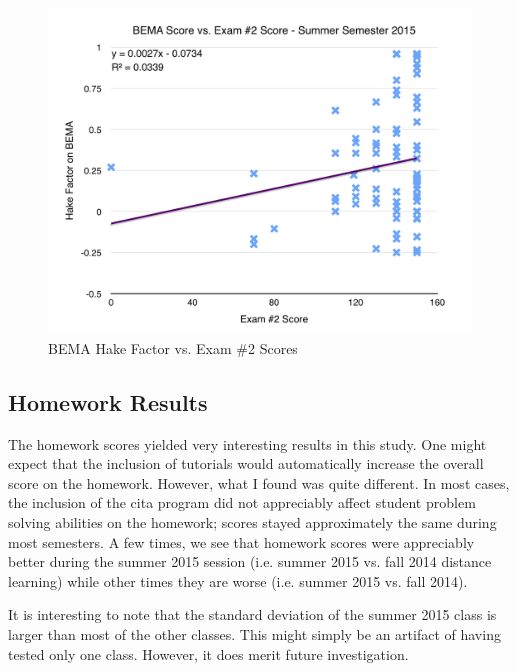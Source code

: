 \begin{figure}
	\centering
	\includegraphics[width=6in]{img/chapter4/bema_vs_ex2_su15}
	\caption[BEMA Hake Factor vs. Exam \#2 Scores]{BEMA Hake Factor vs. Exam \#2 Scores}
  \label{fig:bemaVsExTwoSu15}
\end{figure}

\subsection{Homework Results}

The homework scores yielded very interesting results in this study. One might expect that the inclusion of tutorials would automatically increase the overall score on the homework. However, what I found was quite different. In most cases, the inclusion of the \gls{cita} program did not appreciably affect student problem solving abilities on the homework; scores stayed approximately the same during most semesters. A few times, we see that homework scores were appreciably better during the summer 2015 session (i.e. summer 2015 vs. fall 2014 distance learning) while other times they are worse (i.e. summer 2015 vs. fall 2014).

It is interesting to note that the standard deviation of the summer 2015 class is larger than most of the other classes. This might simply be an artifact of having tested only one class. However, it does merit future investigation.

